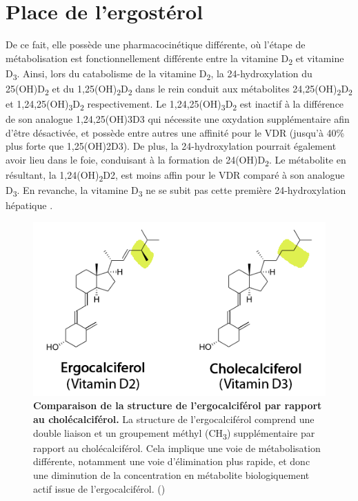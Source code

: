 \documentclass[
  a4paper,
  DIV=11,
  numbers=noendperiod,
  listof=totoc]{scrreprt}
\begin{document}
\hypertarget{place-de-lergostuxe9rol}{%
\section{Place de l'ergostérol}\label{place-de-lergostuxe9rol}}

De ce fait, elle possède une pharmacocinétique différente, où l'étape de
métabolisation est fonctionnellement différente entre la vitamine
D\textsubscript{2} et vitamine D\textsubscript{3}. Ainsi, lors du
catabolisme de la vitamine D\textsubscript{2}, la 24-hydroxylation du
25(OH)D\textsubscript{2} et du
1,25(OH)\textsubscript{2}D\textsubscript{2} dans le rein conduit aux
métabolites 24,25(OH)\textsubscript{2}D\textsubscript{2} et
1,24,25(OH)\textsubscript{3}D\textsubscript{2} respectivement. Le
1,24,25(OH)\textsubscript{3}D\textsubscript{2} est inactif à la
différence de son analogue \ac{1,24,25(OH)3D3} qui nécessite une
oxydation supplémentaire afin d'être désactivée, et possède entre autres
une affinité pour le \ac{VDR} (jusqu'à 40\% plus forte que
\ac{1,25(OH)2D3}). De plus, la 24-hydroxylation pourrait également avoir
lieu dans le foie, conduisant à la formation de
24(OH)D\textsubscript{2}. Le métabolite en résultant, la
1,24(OH)\textsubscript{2}D2, est moins affin pour le \ac{VDR} comparé à
son analogue D\textsubscript{3}. En revanche, la vitamine
D\textsubscript{3} ne se subit pas cette première 24-hydroxylation
hépatique \autocite{Houghton.2006}.

\begin{figure}
\includegraphics{figures/ergo_vs_chole.png} 
\caption[\textbf{Comparaison de la structure de l'ergocalciférol par rapport au cholécalciférol.}]
{\textbf{Comparaison de la structure de l'ergocalciférol par rapport au cholécalciférol.} La structure de l'ergocalciférol comprend une double liaison et un groupement méthyl (CH\textsubscript{3}) supplémentaire par rapport au cholécalciférol. Cela implique une voie de métabolisation différente, notamment une voie d'élimination plus rapide, et donc une diminution de la concentration en métabolite biologiquement actif issue de l'ergocalciférol. (\cite{Houghton.2006})}
\label{fig:ergo-struc}
\end{figure}
\end{document}
